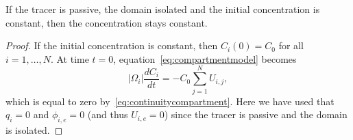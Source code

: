 \begin{property} \label{prop2_comp}
	If the tracer is passive, the domain isolated and the initial concentration is constant, then the concentration stays constant.
\end{property}
\begin{proof}
	If the initial concentration is constant, then $C_i(0) = C_0$ for all $i = 1,\dots,N$. At time $t=0$, equation~\eqref{eq:compartmentmodel} becomes
	\begin{equation}
		|\Omega_i| \frac{dC_i}{dt} = -C_0 \sum_{j=1}^N U_{i,j},
	\end{equation}
	which is equal to zero by~\eqref{eq:continuitycompartment}. Here we have used that $q_i = 0$ and $\phi_{i,e} = 0$ (and thus $U_{i,e}=0$) since the tracer is passive and the domain is isolated.
\end{proof}

